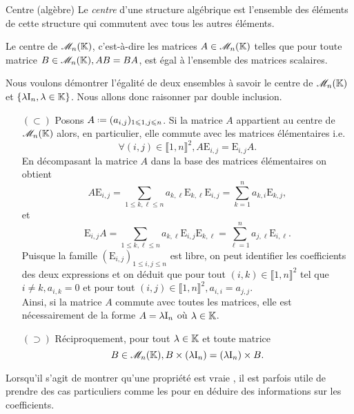 \begin{defi}{Centre (algèbre)}
    Le \emph{centre} d'une structure algébrique est l'ensemble des éléments de cette structure qui commutent avec tous les autres éléments. 
\end{defi}

\begin{prop}
Le centre de $\mathscr{M}_n(\mathbb{K})$, c'est-à-dire les matrices $A \in \mathscr{M}_n(\mathbb{K})$ telles que pour toute matrice $B \in \mathscr{M}_n(\mathbb{K}), AB = BA$, est égal à l'ensemble des matrices scalaires.
\end{prop}


Nous voulons démontrer l'égalité de deux ensembles à savoir le centre de $\mathscr{M}_n(\mathbb{K})$ et $\{ \lambda \mathrm{I}_n, \lambda \in \mathbb{K} \}$. Nous allons donc raisonner par double inclusion. 
\begin{preuve}
    \begin{itemize}
        \item[$(\subset)$] Posons $A \defeq (a_{i,j})_{1 \leqslant 1, j \leqslant n}$. Si la matrice $A$ appartient au centre de $\mathscr{M}_n(\mathbb{K})$ alors, en particulier, elle commute avec les matrices élémentaires \note i.e. 
        $$\forall (i, j) \in \llbracket 1, n \rrbracket^2, A \mathrm{E}_{i,j} = \mathrm{E}_{i,j} A.$$
        En décompasant la matrice $A$ dans la base des matrices élémentaires on obtient
        $$A \mathrm{E}_{i,j} = \sum_{1 \leqslant k, \ell \leqslant n} a_{k, \ell} \mathrm{E}_{k,\ell} \mathrm{E}_{i,j} = \sum_{k=1}^{n} a_{k,i} \mathrm{E}_{k,j},$$
        et
        $$\mathrm{E}_{i,j} A = \sum_{1 \leqslant k, \ell \leqslant n} a_{k, \ell} \mathrm{E}_{i,j} \mathrm{E}_{k,\ell} = \sum_{\ell=1}^{n} a_{j,\ell} \mathrm{E}_{i,\ell}.$$
        Puisque la famille $(\mathrm{E}_{i, j})_{1 \leqslant i, j \leqslant n}$ est libre, on peut identifier les coefficients des deux expressions et on déduit que pour tout $(i, k) \in \llbracket 1, n \rrbracket^2$ tel que $i \not= k, a_{i,k}=0$ et pour tout $(i,j) \in \llbracket 1, n \rrbracket^2, a_{i,i}=a_{j,j}$. \\
        Ainsi, si la matrice $A$ commute avec toutes les matrices, elle est nécessairement de la forme $A = \lambda \mathrm{I}_n$ où $\lambda \in \mathbb{K}$.
        \item[$(\supset)$] Réciproquement, pour tout $\lambda \in \mathbb{K}$ et toute matrice $$B \in \mathscr{M}_n(\mathbb{K}), B \times (\lambda \mathrm{I}_n) = (\lambda \mathrm{I}_n) \times B.$$
    \end{itemize}
\end{preuve}

\begin{methode}
    Lorsqu'il s'agit de montrer qu'une propriété est vraie , il est parfois utile de prendre des cas particuliers comme les  pour en déduire des informations sur les coefficients.
\end{methode}
